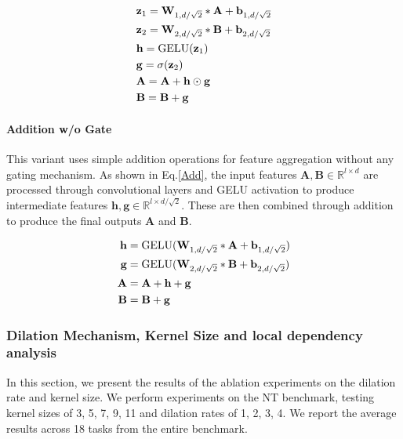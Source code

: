 \begin{equation}\label{dualgate}
\centering
\textcolor{black}{
\begin{aligned}
    &\mathbf{z}_1 = \mathbf{W}_{1, d/\sqrt{2}} * \mathbf{A} + \mathbf{b}_{1, d/\sqrt{2}} \\
    &\mathbf{z}_2 = \mathbf{W}_{2, d/\sqrt{2}} * \mathbf{B} + \mathbf{b}_{2, d/\sqrt{2}} \\
    &\mathbf{h} = \operatorname{GELU}(\mathbf{z}_1) \\
    &\mathbf{g} = \sigma(\mathbf{z}_2) \\
    &\mathbf{A} = \mathbf{A} + \mathbf{h} \odot \mathbf{g} \\
    &\mathbf{B} = \mathbf{B} + \mathbf{g}
\end{aligned}
}
\end{equation}

\paragraph{Addition w/o Gate}

This variant uses simple addition operations for feature aggregation without any gating mechanism. As shown in Eq.\ref{Add}, the input features $\mathbf{A}, \mathbf{B} \in \mathbb{R}^{l \times d}$ are processed through convolutional layers and GELU activation to produce intermediate features $\mathbf{h}, \mathbf{g} \in \mathbb{R}^{l \times d/\sqrt{2}}$. These are then combined through addition to produce the final outputs $\mathbf{A}$ and $\mathbf{B}$.


\begin{equation}\label{Add}
\centering
\textcolor{black}{
\begin{aligned}
    \mathbf{h} &= \operatorname{GELU}(\mathbf{W}_{1, d/\sqrt{2}} * \mathbf{A} + \mathbf{b}_{1, d/\sqrt{2}}) \\
    \mathbf{g} &= \operatorname{GELU}(\mathbf{W}_{2, d/\sqrt{2}} * \mathbf{B} + \mathbf{b}_{2, d/\sqrt{2}}) \\
    \mathbf{A} &= \mathbf{A} + \mathbf{h} + \mathbf{g} \\
    \mathbf{B} &= \mathbf{B} + \mathbf{g}
\end{aligned}
}
\end{equation}

\subsubsection{ Dilation Mechanism, Kernel Size and local dependency analysis}\label{app:dilation_kernel_ablation}
In this section, we present the results of the ablation experiments on the dilation rate and kernel size. We perform experiments on the NT benchmark, testing kernel sizes of 3, 5, 7, 9, 11 and dilation rates of 1, 2, 3, 4. We report the average results across 18 tasks from the entire benchmark.

